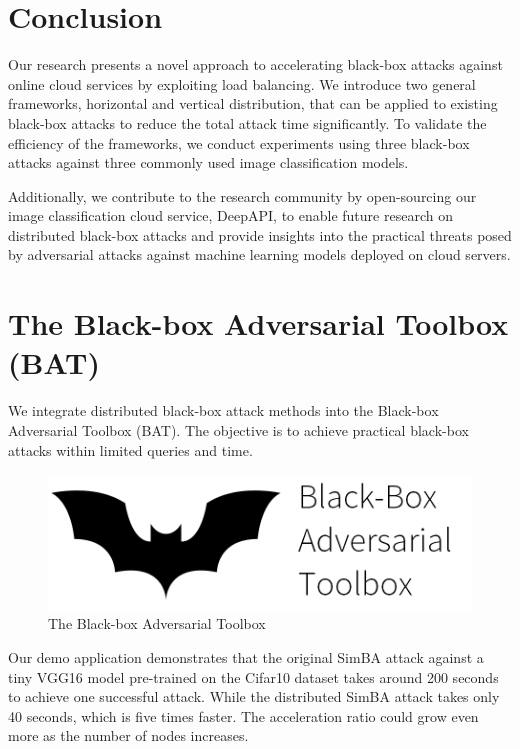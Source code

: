 \section{Conclusion}

Our research presents a novel approach to accelerating black-box attacks against online cloud services by exploiting load balancing. We introduce two general frameworks, horizontal and vertical distribution, that can be applied to existing black-box attacks to reduce the total attack time significantly. To validate the efficiency of the frameworks, we conduct experiments using three black-box attacks against three commonly used image classification models.

Additionally, we contribute to the research community by open-sourcing our image classification cloud service, DeepAPI, to enable future research on distributed black-box attacks and provide insights into the practical threats posed by adversarial attacks against machine learning models deployed on cloud servers.


\section{The Black-box Adversarial Toolbox (BAT)}
\label{sec:bat}

We integrate distributed black-box attack methods into the Black-box Adversarial Toolbox (BAT). The objective is to achieve practical black-box attacks within limited queries and time.

\begin{figure}[H]
\centering
\includegraphics[scale=0.35]{figures/chapter_classification/bat.png}
\caption{The Black-box Adversarial Toolbox}
\label{fig.bat}
\end{figure}

Our demo application demonstrates that the original SimBA attack against a tiny VGG16 model pre-trained on the Cifar10 dataset takes around 200 seconds to achieve one successful attack. While the distributed SimBA attack takes only 40 seconds, which is five times faster. The acceleration ratio could grow even more as the number of nodes increases.

